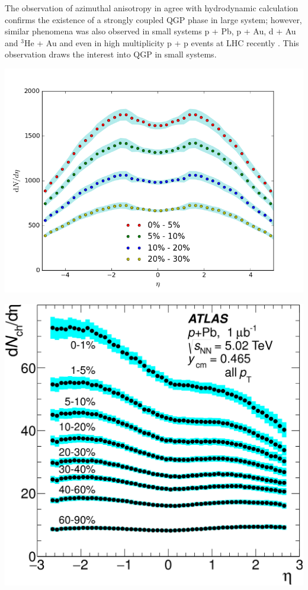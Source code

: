 \documentclass[aps,prl,twocolumn,groupedaddress]{revtex4-1}
\begin{document}
The observation of azimuthal anisotropy in agree with hydrodynamic calculation confirms the existence of a strongly coupled QGP phase in large system; however, similar phenomena was also observed in small systems p + Pb, p + Au, d + Au and ${}^3$He + Au and even in high multiplicity p + p events at LHC recently  \citep{Loizides:2016small, PHENIX:2014dAu, PHYNIX:2015He3Au, CMS:2015-pPb, ALICE:2014pPb}. This observation draws the interest into QGP in small systems.

\includegraphics[width=\columnwidth]{pics/dNdy-AA.png}\label{AA-dNdy}

\includegraphics[width=0.9\columnwidth]{pics/dNdy-pPb.png}\label{pA-dNdy}
\end{document}
